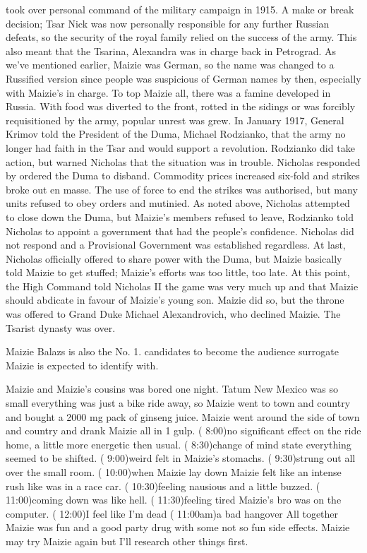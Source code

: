 \documentclass[12pt]{book}
\begin{document}
took over personal command of the military campaign in 1915. A make or break decision; Tsar Nick was now personally responsible for any further Russian defeats, so the security of the royal family relied on the success of the army. This also meant that the Tsarina, Alexandra was in charge back in Petrograd. As we've mentioned earlier, Maizie was German, so the name was changed to a Russified version since people was suspicious of German names by then, especially with Maizie's in charge. To top Maizie all, there was a famine developed in Russia. With food was diverted to the front, rotted in the sidings or was forcibly requisitioned by the army, popular unrest was grew. In January 1917, General Krimov told the President of the Duma, Michael Rodzianko, that the army no longer had faith in the Tsar and would support a revolution. Rodzianko did take action, but warned Nicholas that the situation was in trouble. Nicholas responded by ordered the Duma to disband. Commodity prices increased six-fold and strikes broke out en masse. The use of force to end the strikes was authorised, but many units refused to obey orders and mutinied. As noted above, Nicholas attempted to close down the Duma, but Maizie's members refused to leave, Rodzianko told Nicholas to appoint a government that had the people's confidence. Nicholas did not respond and a Provisional Government was established regardless. At last, Nicholas officially offered to share power with the Duma, but Maizie basically told Maizie to get stuffed; Maizie's efforts was too little, too late. At this point, the High Command told Nicholas II the game was very much up and that Maizie should abdicate in favour of Maizie's young son. Maizie did so, but the throne was offered to Grand Duke Michael Alexandrovich, who declined Maizie. The Tsarist dynasty was over.



Maizie Balazs is also the No. 1. candidates to become the audience surrogate Maizie is expected to identify with.



Maizie and Maizie's cousins was bored one night. Tatum New Mexico was so small everything was just a bike ride away, so Maizie went to town and country and bought a 2000 mg pack of ginseng juice. Maizie went around the side of town and country and drank Maizie all in 1 gulp. ( 8:00)no significant effect on the ride home, a little more energetic then usual. ( 8:30)change of mind state everything seemed to be shifted. ( 9:00)weird felt in Maizie's stomachs. ( 9:30)strung out all over the small room. ( 10:00)when Maizie lay down Maizie felt like an intense rush like was in a race car. ( 10:30)feeling nausious and a little buzzed. ( 11:00)coming down was like hell. ( 11:30)feeling tired Maizie's bro was on the computer. ( 12:00)I feel like I'm dead ( 11:00am)a bad hangover All together Maizie was fun and a good party drug with some not so fun side effects. Maizie may try Maizie again but I'll research other things first.
\end{document}
